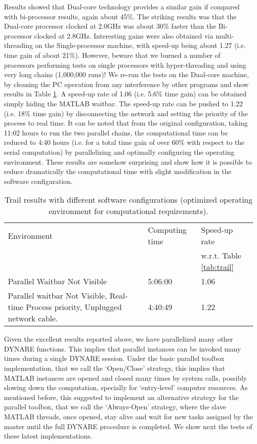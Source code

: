 \documentclass[12pt,a4paper,pdftex]{article}
\begin{document}
Results showed that Dual-core technology provides a similar gain if compared with bi-processor results, again about 45\%. The striking results was that the Dual-core processor clocked at 2.0GHz was about 30\% faster than the Bi-processor clocked at 2.8GHz. Interesting gains were also obtained via multi-threading on the Single-processor machine, with speed-up being about 1.27 (i.e. time gain of about 21\%). However, beware that we burned a number of processors performing tests on single processors with hyper-threading and using very long chains (1,000,000 runs)!
We re-run the tests on the Dual-core machine, by cleaning the PC operation from any interference by other programs and show results in Table \ref{tab:trail2}.
A speed-up rate of 1.06 (i.e. 5.6\% time gain) can be obtained simply hiding the MATLAB waitbar. The speed-up rate can be pushed to 1.22 (i.e. 18\% time gain) by disconnecting the network and setting the priority of the process to real time. It can be noted that from the original configuration, taking 11:02 hours to run the two parallel chains, the computational time can be reduced to 4:40 hours (i.e. for a total time gain of over 60\% with respect to the serial computation) by parallelizing and optimally configuring the operating environment.
These results are somehow surprising and show how it is possible to reduce dramatically the computational time with slight modification in the software configuration.
\begin{table}[t]
\begin{centering}
\begin{tabular}{p{5cm}|l|l}
Environment	& Computing time & Speed-up rate \\
& & w.r.t. Table \ref{tab:trail}\\ \hline
Parallel Waitbar Not Visible & 5:06:00 & 1.06 \\ \hline
Parallel waitbar Not Visible, Real-time Process priority,
Unplugged network cable. &
	4:40:49 & 1.22\\
  \hline
\end{tabular}
\caption{Trail results with different software configurations (optimized operating environment for computational requirements).}\label{tab:trail2}
\end{centering}
\end{table}

Given the excellent results reported above, we have parallelized many other DYNARE functions. This implies that parallel instances can be invoked many times during a single DYNARE session. Under the basic parallel toolbox implementation, that we call the `Open/Close' strategy, this implies that MATLAB instances are opened and closed many times by system calls, possibly slowing down the computation, specially for `entry-level' computer resources. As mentioned before, this suggested to implement an alternative strategy for the parallel toolbox, that we call the `Always-Open' strategy, where the slave MATLAB threads, once opened, stay alive and wait for new tasks assigned by the master until the full DYNARE procedure is completed. We show next the tests of these latest implementations.
\end{document}
